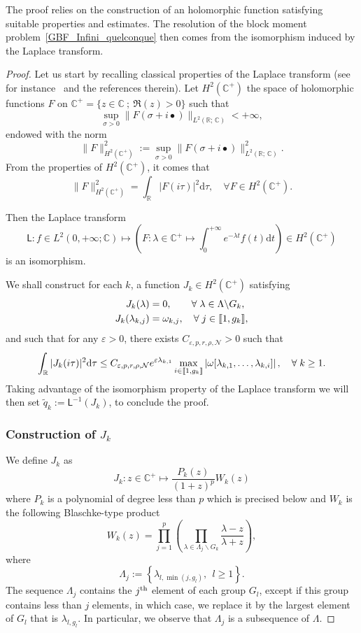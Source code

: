 \documentclass[AHL,Unicode,longabstracts]{cedram}
\newcommand{\llbracket}{\mathopen{[\mkern -2.7mu[}}
\newcommand{\rrbracket}{\mathclose{]\mkern -2.7mu]}}
\newcommand{\inter}[2]{\llbracket #1,#2 \rrbracket}
\newcommand{\n}{g}
\newcommand{\NN}{\mathcal{N}}
\newcommand{\R}{\mathbb{R}}
\newcommand{\C}{\mathbb{C}}
\newcommand{\md}{\mathrm{d}}
\renewcommand{\cdot}{{\scriptstyle \bullet}}
\let\oldforall\forall
\renewcommand*{\forall}{\mathrel{\oldforall}}
\begin{document}
The proof relies on the construction of an holomorphic function satisfying suitable properties and estimates. The resolution of the block moment problem~\eqref{GBF_Infini_quelconque} then comes from the isomorphism induced by the Laplace transform.
\begin{proof}
Let us start by recalling classical properties of the Laplace transform (see for instance~\cite[pp.~19-20]{SchwartzThese} and the references therein). Let $H^2(\C^+)$ the space of holomorphic functions $F$ on $\C^+ = \{ z \in \C \: ; \: \Re(z) >0 \}$ such that
\[
\sup_{\sigma >0 } \| F(\sigma + i \cdot) \|_{L^2(\R ;\,\C)} < + \infty,
\]
endowed with the norm
\[
\| F \|_{H^2(\C^+)}^2 := \sup_{\sigma >0 } \| F(\sigma + i \cdot) \|^2_{L^2(\R ;\,\C)}.
\]
From the properties of $H^2(\C^+)$, it comes that
\[
\| F \|_{H^2(\C^+)}^2 = \int_\R | F(i \tau)|^2 \md \tau, \quad \forall F \in H^2(\C^+).
\]


\goodbreak
Then the Laplace transform
\[
\mathsf{L} : f \in L^2(0,+\infty ; \C) \mapsto \left(F : \lambda \in \C^+ \mapsto \int_0^{+\infty} e^{-\lambda t } f(t) \md t \right) \in H^2(\C^+)
\]
is an isomorphism.

We shall construct for each $k$, a function $J_k \in H^2(\C^+)$ satisfying
\begin{align}\label{ProprietesJk1}
J_k(\lambda) &= 0, \qquad \forall \lambda \in \Lambda \backslash G_k,
\\
J_k(\lambda_{k,j}) &= \omega_{k,j}, \quad \forall j \in \inter{1}{\n_k},\label{ProprietesJk2}
\end{align}
and such that for any $\varepsilon >0$, there exists $C_{\varepsilon, p, r, \rho, \NN}>0$ such that
\[
\int_\R | J_k(i \tau)|^2 \md \tau \leq C_{\varepsilon, p, r, \rho, \NN} e^{\varepsilon \lambda_{k,1}} \max \limits_{i\in \inter{1}{\n_k}} \left| \omega[\lambda_{k,1}, \dots, \lambda_{k,i}] \right|, \quad \forall k \geq 1.
\]
Taking advantage of the isomorphism property of the Laplace transform we will then set $\widetilde{q}_k := \mathsf{L}^{-1} (J_k)$, to conclude the proof.


\subsubsection{Construction of $J_k$}
We define $J_k$ as
\begin{equation*}\label{Forme_Jk}
J_k : z \in \C^+ \mapsto \frac{P_k(z)}{(1+z)^p} W_k(z)
\end{equation*}
where $P_k$ is a polynomial of degree less than $p$ which is precised below and $W_k$ is the following Blaschke-type product
\[
W_k(z) = \prod_{j=1}^p \left(\prod_{\lambda \in \Lambda_j \backslash G_k} \frac{\lambda-z}{\lambda+z}\right),
\]
where
\begin{equation}\label{def_Lambda_j}
\Lambda_j:=\left\{\lambda_{l,\min(j,\n_l)},\ \ l\geq 1\right\}.
\end{equation}
The sequence $\Lambda_j$ contains the $j^{\rm th}$ element of each group $G_l$, except if this group contains less than $j$ elements, in which case, we replace it by the largest element of $G_l$ that is $\lambda_{l,\n_l}$. In particular, we observe that $\Lambda_j$ is a subsequence of $\Lambda$.



\end{proof}
\end{document}
